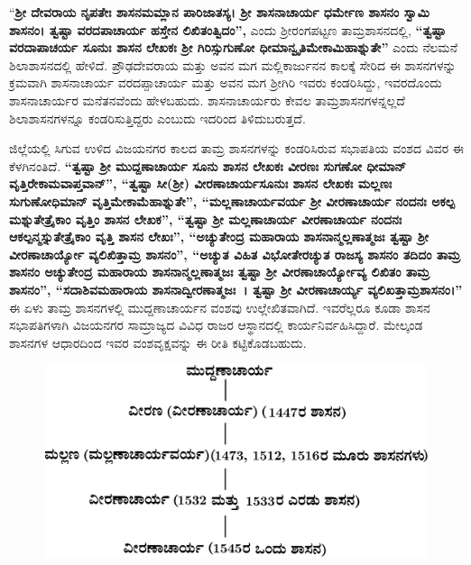 \vskip -2pt

“\textbf{ಶ‍್ರೀ ದೇವರಾಯ ನೃಪತೇಃ ಶಾಸನಮಮ್ಲಾನ ಪಾರಿಜಾತಸ್ಯ। ಶ‍್ರೀ ಶಾಸನಾಚಾರ್ಯ ಧರ್ಮೇಣ ಶಾಸನಂ ಸ್ವಾಮಿ ಶಾಸನಂ। ತ್ವಷ್ಟಾ ವರದಪಾಚಾರ್ಯ ಹಸ್ತೇನ ಲಿಖಿತಂತ್ವಿದಂ”, }ಎಂದು ಶ‍್ರೀರಂಗಪಟ್ಟಣ ತಾಮ್ರಶಾಸನದಲ್ಲಿ,\textbf{ “ತ್ವಷ್ಟಾ ವರದಾಪಾಚರ್ಯ ಸೂನುಃ ಶಾಸನ ಲೇಖಕಃ ಶ‍್ರೀ ಗಿರಿಸ್ಸುಗುಣೋ ಧೀಮಾನ್ವೃತಿಮೇಕಾಮಿಹಾಶ್ನುತೇ”} ಎಂದು ನೆಲಮನೆ ಶಿಲಾಶಾಸನದಲ್ಲಿ ಹೇಳಿದೆ. ಪ್ರೌಢದೇವರಾಯ ಮತ್ತು ಅವನ ಮಗ ಮಲ್ಲಿಕಾರ್ಜುನನ ಕಾಲಕ್ಕೆ ಸೇರಿದ ಈ ಶಾಸನಗಳನ್ನು ಕ್ರಮವಾಗಿ ಶಾಸನಾಚಾರ್ಯ ವರದಪ್ಪಾಚಾರ್ಯ ಮತ್ತು ಅವನ ಮಗ ಶ‍್ರೀಗಿರಿ ಇವರು ಕಂಡರಿಸಿದ್ದು, ಇವರದೊಂದು ಶಾಸನಾಚಾರ್ಯರ ಮನೆತನವೆಂದು ಹೇಳಬಹುದು. ಶಾಸನಾಚಾರ್ಯರು ಕೇವಲ ತಾಮ್ರಶಾಸನಗಳನ್ನಲ್ಲದೆ ಶಿಲಾಶಾಸನಗಳನ್ನೂ ಕಂಡರಿಸುತ್ತಿದ್ದರು ಎಂಬುದು ಇದರಿಂದ ತಿಳಿದುಬರುತ್ತದೆ.

ಜಿಲ್ಲೆಯಲ್ಲಿ ಸಿಗುವ ಉಳಿದ ವಿಜಯನಗರ ಕಾಲದ ತಾಮ್ರ ಶಾಸನಗಳನ್ನು ಕಂಡರಿಸಿರುವ ಸಭಾಪತಿಯ ವಂಶದ ವಿವರ ಈ ಕೆಳಗಿನಂತಿದೆ. \textbf{“ತ್ವಷ್ಟಾ ಶ‍್ರೀ ಮುದ್ದಣಾಚಾರ್ಯ ಸೂನು ಶಾಸನ ಲೇಖಕಃ ವೀರಣಃ ಸುಗಣೋ ಧೀಮಾನ್​ ವೃತ್ತಿರೇಕಾಮವಾಪ್ತವಾನ್​”, “ತ್ವಷ್ಟಾ ಸೀ(ಶ‍್ರೀ) ವೀರಣಾಚಾರ್ಯ\-ಸೂನುಃ ಶಾಸನ ಲೇಖಕಃ ಮಲ್ಲಣಃ ಸುಗುಣೋಧಿಮಾನ್​ ವೃತ್ತಿಮೇಕಾಮೆಹಾಶ್ನುತೇ”, “ಮಲ್ಲಣಾಚಾರ್ಯವರ್ಯ ಶ‍್ರೀ ವೀರಣಾಚಾರ್ಯ ನಂದನಃ ಅಕಲ್ಪ ಮಶ್ನುತೇತ್ರೈಕಾಂ ವೃತ್ತಿಂ ಶಾಸನ ಲೇಖಕ”, “ತ್ವಷ್ಟಾ ಶ‍್ರೀ ಮಲ್ಲಣಾಚಾರ್ಯ ವೀರಣಾಚಾರ್ಯ ನಂದನಃ ಆಕಲ್ಪನ್ಮಸ್ನುತೇತ್ರೈಕಾಂ ವೃತ್ತಿ ಶಾಸನ ಲೇಖಃ”, “ಅಚ್ಯುತೇಂದ್ರ ಮಹಾರಾಯ ಶಾಸನಾನ್ಮಲ್ಲಣಾತ್ಮಜಃ ತ್ವಷ್ಟಾ ಶ‍್ರೀ ವೀರಣಾಚಾರ್ಯ್ಯೋ ವ್ಯಲಿಖಿತ್ತಾಮ್ರ ಶಾಸನಂ”, “ಅಚ್ಯುತ ವಿಹಿತ ವಿಭೋತೇರಚ್ಯುತ ರಾಜಸ್ಯ ಶಾಸನಂ ತದಿದಂ ತಾಮ್ರ ಶಾಸನಂ ಅಚ್ಯುತೇಂದ್ರ ಮಹಾರಾಯ ಶಾಸನಾನ್ಮಲ್ಲಣಾತ್ಮಜಃ ತ್ವಷ್ಟಾ ಶ‍್ರೀ ವೀರಣಾಚಾರ್ಯ್ಯೋವ್ಯ ಲಿಖಿತಂ ತಾಮ್ರ ಶಾಸನಂ”, “ಸದಾಶಿವಮಹಾರಾಯ ಶಾಸನಾದ್ವೀರಣಾತ್ಮಜಃ~। ತ್ವಷ್ಟಾ ಶ‍್ರೀ ವೀರಣಾಚಾರ್ಯ್ಯ ವ್ಯಲಿಖತ್ತಾಮ್ರಶಾಸನಂ।”} ಈ ಏಳು ತಾಮ್ರ ಶಾಸನಗಳಲ್ಲಿ ಮುದ್ದಣಾಚಾರ್ಯನ ವಂಶವು ಉಲ್ಲೇಖಿತವಾಗಿದೆ. ಇವರೆಲ್ಲರೂ ಕೂಡಾ ಶಾಸನ ಸಭಾಪತಿಗಳಾಗಿ ವಿಜಯನಗರ ಸಾಮ್ರಾಜ್ಯದ ವಿವಿಧ ರಾಜರ ಆಸ್ಥಾನದಲ್ಲಿ ಕಾರ್ಯನಿರ್ವಹಿಸಿದ್ದಾರೆ. ಮೇಲ್ಕಂಡ ಶಾಸನಗಳ ಆಧಾರದಿಂದ ಇವರ ವಂಶವೃಕ್ಷವನ್ನು ಈ ರೀತಿ ಕಟ್ಟಿಕೊಡಬಹುದು.

\begin{figure}[!h]
\includegraphics{images/chap5/chap5fig5.jpeg}
\end{figure}


